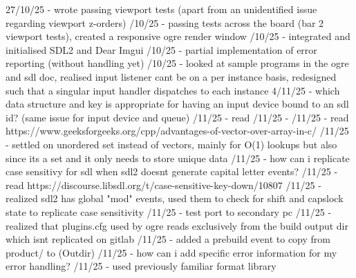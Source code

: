 \documentclass[]{final_report}
\begin{document}
27/10/25 - wrote passing viewport tests (apart from an unidentified issue regarding viewport z-orders) /10/25 - passing tests across the board (bar 2 viewport tests), created a responsive ogre render window /10/25 - integrated and initialised SDL2 and Dear Imgui /10/25 - partial implementation of error reporting (without handling yet) /10/25 - looked at sample programs in the ogre and sdl doc, realised input listener cant be on a per instance basis, redesigned such that a singular input handler dispatches to each instance 
4/11/25 - which data structure and key is appropriate for having an input device bound to an sdl id? (same issue for input device and queue) /11/25 - read  /11/25 -  /11/25 - read https://www.geeksforgeeks.org/cpp/advantages-of-vector-over-array-in-c/ /11/25 - settled on unordered set instead of vectors, mainly for O(1) lookups but also since its a set and it only needs to store unique data /11/25 - how can i replicate case sensitivy for sdl when sdl2 doesnt generate capital letter events? /11/25 - read https://discourse.libsdl.org/t/case-sensitive-key-down/10807 /11/25 - realized sdl2 has global "mod" events, used them to check for shift and capslock state to replicate case sensitivity /11/25 - test port to secondary pc /11/25 - realized that plugins.cfg used by ogre reads exclusively from the build output dir which isnt replicated on gitlab /11/25 - added a prebuild event to copy from product/ to (Outdir) /11/25 - how can i add specific error information for my error handling? /11/25 - used previously familiar format library \newline
\end{document}
